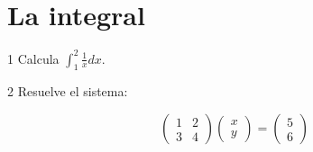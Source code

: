 \documentclass[11pt]{article}
\title{#1}\author{#2}\date{}%
\begin{document}

\section*{La integral}

\begin{clproblem}{1}{}
Calcula \(\int_{1}^{2} \frac{1}{x}dx\).

\end{clproblem}

\begin{clproblem}{2}{}
Resuelve el sistema:

\[
\begin{pmatrix}1 & 2 \\ 3 & 4\end{pmatrix} \begin{pmatrix}x \\ y\end{pmatrix} = \begin{pmatrix}5 \\ 6\end{pmatrix}
\]
\end{clproblem}
\end{document}
